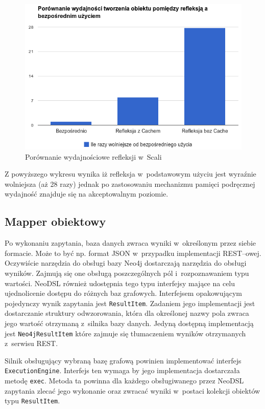 \documentclass{xmgr}
\begin{document}
\begin{figure}[H]
	\includegraphics[scale=0.65]{images/reflection-comparison.png}
	\caption{Porównanie wydajnościowe refleksji w~Scali}
	\label{fig:reflection_comparison}
\end{figure}

Z powyższego wykresu wynika iż refleksja w~podstawowym użyciu jest wyraźnie wolniejsza (aż 28 razy) jednak po zastosowaniu mechanizmu pamięci podręcznej wydajność znajduje się na akceptowalnym poziomie.

\subsection{Mapper obiektowy}

Po wykonaniu zapytania, baza danych zwraca wyniki w~określonym przez siebie formacie. Może to być np. format JSON w~przypadku implementacji REST--owej. Oczywiście narzędzia do obsługi bazy Neo4j dostarczają narzędzia do obsługi wyników. Zajmują się one obsługą poszczególnych pól i~rozpoznawaniem typu wartości. NeoDSL również udostępnia tego typu interfejsy mające na celu ujednolicenie dostępu do różnych baz grafowych. Interfejsem opakowującym pojedynczy wynik zapytania jest \texttt{ResultItem}. Zadaniem jego implementacji jest dostarczanie struktury odwzorowania, która dla określonej nazwy pola zwraca jego wartość otrzymaną z~silnika bazy danych. Jedyną dostępną implementacją jest \texttt{Neo4jResultItem} które zajmuje się tłumaczeniem wyników otrzymanych z~serwisu REST.

Silnik obsługujący wybraną bazę grafową powinien implementować interfejs \texttt{ExecutionEngine}. Interfejs ten wymaga by jego implementacja dostarczała metodę \texttt{exec}. Metoda ta powinna dla każdego obsługiwanego przez NeoDSL zapytania zlecać jego wykonanie oraz zwracać wyniki w~postaci kolekcji obiektów typu \texttt{ResultItem}.
\end{document}
